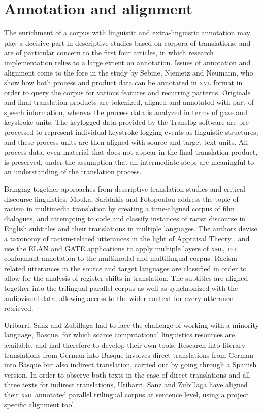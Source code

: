 \documentclass[output=paper]{LSP/langsci}
\begin{document}
\section{Annotation and alignment} 
The enrichment of a corpus with linguistic and extra-linguistic annotation may play a decisive part in descriptive studies based on corpora of translations, and are of particular concern to the first four articles, in which research implementation relies to a large extent on annotation. Issues of annotation and alignment come to the fore in the study by Sebine, Niemetz and Neumann, who show how both process and product data can be annotated in \textsc{xml} format in order to query the corpus for various features and recurring patterns. Originals and final translation products are tokenized, aligned and annotated with part of speech information, whereas the process data is analyzed in terms of gaze and keystroke units. The keylogged data provided by the Translog software are pre-processed to represent individual keystroke logging events as linguistic structures, and these process units are then aligned with source and target text units. All process data, even material that does not appear in the final translation product, is preserved, under the assumption that all intermediate steps are meaningful to an understanding of the translation process. 

Bringing together approaches from descriptive translation studies and critical discourse linguistics, Mouka, Saridakis and Fotopoulou address the topic of racism in multimedia translation by creating a time-aligned corpus of film dialogues, and attempting to code and classify instances of racist discourse in English subtitles and their translations in multiple languages. The authors devise a taxonomy of racism-related utterances in the light of Appraisal Theory \citep{MartinWhite2005}, and use the ELAN and GATE applications to apply multiple layers of \textsc{xml}, \textsc{tei} conformant annotation to the multimodal and multilingual corpus. Racism-related utterances in the source and target languages are classified in order to allow for the analysis of register shifts in translation. The subtitles are aligned together into the trilingual parallel corpus as well as synchronized with the audiovisual data, allowing access to the wider context for every utterance retrieved. 

Uribarri, Sanz and Zubillaga had to face the challenge of working with a minority language, Basque, for which scarce computational linguistics resources are available, and had therefore to develop their own tools. Research into literary translations from German into Basque involves direct translations from German into Basque but also indirect translation, carried out by going through a Spanish version. In order to observe both texts in the case of direct translations and all three texts for indirect translations, Uribarri, Sanz and Zubillaga have aligned their \textsc{xml} annotated parallel trilingual corpus at sentence level, using a project specific alignment tool.
\end{document}
